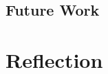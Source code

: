 \documentclass[11pt]{book}
\begin{document}
\section{Future Work}

\chapter{Reflection}

\printbibliography
\end{document}
